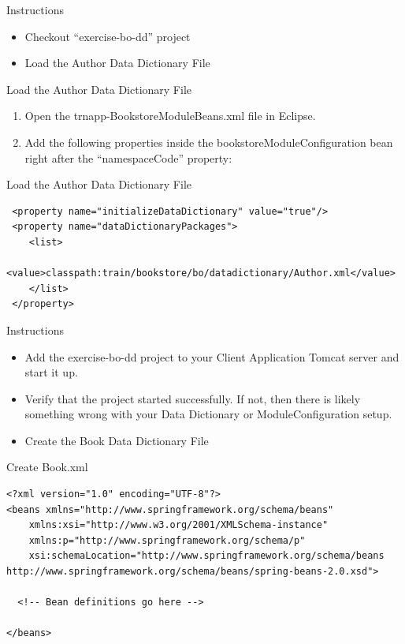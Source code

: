 \documentclass[xcolor=dvipsnames,14pt,professionalfonts]{beamer}
\begin{document}
\begin{frame}{Instructions}
  \begin{itemize}
  \item Checkout “exercise-bo-dd” project
  \item Load the Author Data Dictionary File
  \end{itemize}
\end{frame}

\begin{frame}{Load the Author Data Dictionary File}
  \begin{enumerate}
  \item Open the trnapp-BookstoreModuleBeans.xml file in Eclipse.
  \item Add the following properties inside the
    bookstoreModuleConfiguration bean right after the “namespaceCode”
    property:
  \end{enumerate}
\end{frame}

\begin{frame}[fragile]{Load the Author Data Dictionary File}
    \begin{verbatim}
 <property name="initializeDataDictionary" value="true"/>
 <property name="dataDictionaryPackages">
    <list>
        <value>classpath:train/bookstore/bo/datadictionary/Author.xml</value>
    </list>
 </property>
    \end{verbatim}
\end{frame}

    
\begin{frame}{Instructions}
  \begin{itemize}
    \item Add the exercise-bo-dd project to your Client Application Tomcat server and start it up.
    \item Verify that the project started successfully.  If not, then there is likely something wrong with your Data Dictionary or ModuleConfiguration setup.
    \item Create the Book Data Dictionary File
  \end{itemize}
\end{frame}

\begin{frame}[fragile]{Create Book.xml}
    \begin{verbatim}
<?xml version="1.0" encoding="UTF-8"?>
<beans xmlns="http://www.springframework.org/schema/beans"
	xmlns:xsi="http://www.w3.org/2001/XMLSchema-instance"
	xmlns:p="http://www.springframework.org/schema/p"
	xsi:schemaLocation="http://www.springframework.org/schema/beans http://www.springframework.org/schema/beans/spring-beans-2.0.xsd">

  <!-- Bean definitions go here -->

</beans>
\end{verbatim}
\end{frame}
\end{document}
